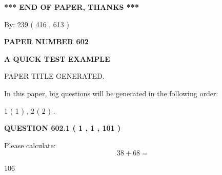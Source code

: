\documentclass[12pt]{article}
\begin{document}
   
   
   
\vspace{1.0in} 
{\textbf{\large{ *** END OF PAPER, THANKS *** }}} 
   
   
\hspace{1.0in} By: 
 239 ( 416 ,  613 )
   
   
   
   
\newpage 
\setcounter{page}{ 
   602001 } 
   
   
   
   
 {\textbf{ \Large{ PAPER NUMBER  602  }}}
   
   
\vspace{0.2in}
   
   
   
   
   
   
   
   
 \vspace{0.2in}
{\LARGE {\textbf{ A QUICK TEST EXAMPLE}}}
   
   
 PAPER TITLE GENERATED.
   
   
   
\vspace{0.2in}
   
In this paper, big questions will be generated in the following order: 
   
   
   1 ( 1 )
 ,
   2 ( 2 )
 .
  
\vspace{0.2in}
  
{\textbf{\Large{QUESTION
602.1 
 ( 1 , 1 , 101 )
}}}
  
  
 
Please calculate:
\begin{equation}
38 +  %
68 = \nonumber
\end{equation}
 
 
 
\noindent{}
 
 

106
 
 
\noindent{}
 
 

 
 
 
\noindent{}
 
\end{document}
